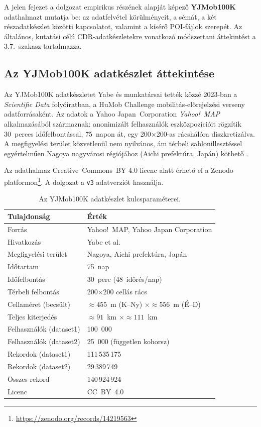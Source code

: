 
A jelen fejezet a dolgozat empirikus részének alapját képező \textbf{YJMob100K} \cite{yabe2023metropolitan} adathalmazt mutatja be: az adatfelvétel körülményeit, a sémát, a két részadatkészlet közötti kapcsolatot, valamint a kísérő POI-fájlok szerepét. Az általános, kutatási célú CDR-adatkészletekre vonatkozó módszertani áttekintést a 3.7.\ szakasz tartalmazza.

\subsection{Az YJMob100K adatkészlet áttekintése}

Az YJMob100K adatkészletet Yabe és munkatársai \cite{yabe2023metropolitan} tették közzé 2023-ban a \emph{Scientific Data} folyóiratban, a HuMob Challenge mobilitás-előrejelzési verseny adatforrásaként. Az adatok a Yahoo Japan~Corporation \emph{Yahoo!~MAP} alkalmazásából származnak: anonimizált felhasználók eszközpozícióit rögzítik 30~perces időfelbontással, 75~napon át, egy 200$\times$200-as rácshálóra diszkretizálva. A megfigyelési terület közvetlenül nem nyilvános, ám térbeli sablonillesztéssel egyértelműen Nagoya nagyvárosi régiójához (Aichi prefektúra, Japán) köthető \cite{pinter2024revealing}.

Az adathalmaz Creative~Commons~BY 4.0 licenc alatt érhető el a Zenodo platformon\footnote{\url{https://zenodo.org/records/14219563}}. A dolgozat a \texttt{v3} adatverziót használja.

\begin{table}[H]
\centering
\caption{Az YJMob100K adatkészlet kulcsparaméterei.}
\label{tab:yjmob_summary}
\begin{tabular}{l l}
\hline
\textbf{Tulajdonság} & \textbf{Érték} \\
\hline
Forrás                  & Yahoo!~MAP, Yahoo Japan Corporation \\
Hivatkozás              & Yabe et al.\ \cite{yabe2023metropolitan} \\
Megfigyelési terület    & Nagoya, Aichi prefektúra, Japán \\
Időtartam               & 75~nap \\
Időfelbontás            & 30~perc (48~időrés/nap) \\
Térbeli felbontás       & 200$\times$200 cellás rács \\
Cellaméret (becsült)    & $\approx 455$~m (K--Ny) $\times \approx 556$~m (É--D) \\
Teljes kiterjedés       & $\approx 91$~km $\times \approx 111$~km \\
Felhasználók (dataset1) & 100~000 \\
Felhasználók (dataset2) & 25~000 (független kohorsz) \\
Rekordok (dataset1)     & 111\,535\,175 \\
Rekordok (dataset2)     &  29\,389\,749 \\
Összes rekord           & 140\,924\,924 \\
Licenc                  & CC~BY~4.0 \\
\hline
\end{tabular}
\end{table}

